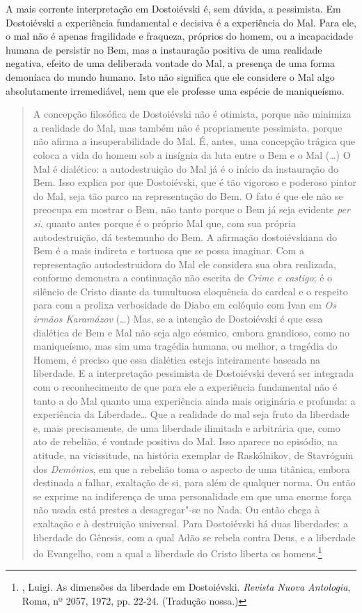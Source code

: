 A mais corrente interpretação em Dostoiévski é, sem dúvida, a
pessimista. Em Dostoiévski a experiência fundamental e decisiva é a
experiência do Mal. Para ele, o mal não é apenas fragilidade e fraqueza,
próprios do homem, ou a incapacidade humana de persistir no Bem, mas a
instauração positiva de uma realidade negativa, efeito de uma deliberada
vontade do Mal, a presença de uma forma demoníaca do mundo humano. Isto
não significa que ele considere o Mal algo absolutamente irremediável,
nem que ele professe uma espécie de maniqueísmo.

\begin{quotation}
A concepção filosófica de Dostoiévski não é otimista, porque não
minimiza a realidade do Mal, mas também não é propriamente pessimista,
porque não afirma a insuperabilidade do Mal. É, antes, uma concepção
trágica que coloca a vida do homem sob a insígnia da luta entre o Bem e
o Mal (\ldots{}) O Mal é dialético: a autodestruição do Mal já é o início da
instauração do Bem. Isso explica por que Dostoiévski, que é tão vigoroso
e poderoso pintor do Mal, seja tão parco na representação do Bem. O fato
é que ele não se preocupa em mostrar o Bem, não tanto porque o Bem já
seja evidente \emph{per si}, quanto antes porque é o próprio Mal que,
com sua própria autodestruição, dá testemunho do Bem. A afirmação
dostoiévskiana do Bem é a mais indireta e tortuosa que se possa
imaginar. Com a representação autodestruidora do Mal ele considera sua
obra realizada, conforme demonstra a continuação não escrita de
\emph{Crime e castigo}; é o silêncio de Cristo diante da tumultuosa
eloquência do cardeal e o respeito para com a prolixa verbosidade do
Diabo em colóquio com Ivan em \emph{Os irmãos Karamázov} (\ldots{}) Mas, se a
intenção de Dostoiévski é que essa dialética de Bem e Mal não seja algo
cósmico, embora grandioso, como no maniqueísmo, mas sim uma tragédia
humana, ou melhor, a tragédia do Homem, é preciso que essa dialética
esteja inteiramente baseada na liberdade. E a interpretação pessimista
de Dostoiévski deverá ser integrada com o reconhecimento de que para ele
a experiência fundamental não é tanto a do Mal quanto uma experiência
ainda mais originária e profunda: a experiência da Liberdade\ldots{} Que a
realidade do mal seja fruto da liberdade e, mais precisamente, de uma
liberdade ilimitada e arbitrária que, como ato de rebelião, é vontade
positiva do Mal. Isso aparece no episódio, na atitude, na vicissitude,
na história exemplar de Raskólnikov, de Stavróguin dos \emph{Demônios},
em que a rebelião toma o aspecto de uma titânica, embora destinada a
falhar, exaltação de si, para além de qualquer norma. Ou então se
exprime na indiferença de uma personalidade em que uma enorme força não
usada está prestes a desagregar"-se no Nada. Ou então chega à exaltação e
à destruição universal. Para Dostoiévski há duas liberdades: a liberdade
do Gênesis, com a qual Adão se rebela contra Deus, e a liberdade do
Evangelho, com a qual a liberdade do Cristo liberta os homens.\footnote{,
  Luigi. As dimensões da liberdade em Dostoiévski. \emph{Revista Nuova
  Antologia}, Roma, nº 2057, 1972, pp. 22-24. (Tradução nossa.)}
\end{quotation}

